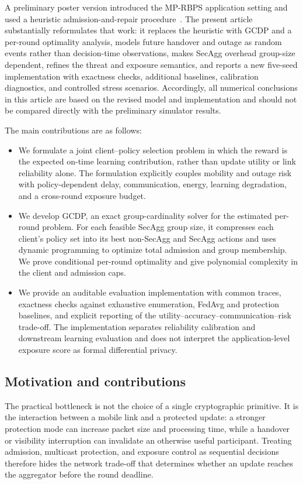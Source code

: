 \documentclass[preprint,12pt]{elsarticle}
\begin{document}
A preliminary poster version introduced the MP-RBPS application setting and used a heuristic admission-and-repair procedure~\cite{ma2026mswim}. The present article substantially reformulates that work: it replaces the heuristic with GCDP and a per-round optimality analysis, models future handover and outage as random events rather than decision-time observations, makes SecAgg overhead group-size dependent, refines the threat and exposure semantics, and reports a new five-seed implementation with exactness checks, additional baselines, calibration diagnostics, and controlled stress scenarios. Accordingly, all numerical conclusions in this article are based on the revised model and implementation and should not be compared directly with the preliminary simulator results.

The main contributions are as follows:
\begin{itemize}
	\item We formulate a joint client--policy selection problem in which the reward is the expected on-time learning contribution, rather than update utility or link reliability alone. The formulation explicitly couples mobility and outage risk with policy-dependent delay, communication, energy, learning degradation, and a cross-round exposure budget.
	
	\item We develop GCDP, an exact group-cardinality solver for the estimated per-round problem. For each feasible SecAgg group size, it compresses each client's policy set into its best non-SecAgg and SecAgg actions and uses dynamic programming to optimize total admission and group membership. We prove conditional per-round optimality and give polynomial complexity in the client and admission caps.
	
	\item We provide an auditable evaluation implementation with common traces, exactness checks against exhaustive enumeration, FedAvg and protection baselines, and explicit reporting of the utility--accuracy--communication--risk trade-off. The implementation separates reliability calibration and downstream learning evaluation and does not interpret the application-level exposure score as formal differential privacy.
\end{itemize}

\subsection{Motivation and contributions}
\label{sec:motivation_contributions}
The practical bottleneck is not the choice of a single cryptographic primitive. It is the interaction between a mobile link and a protected update: a stronger protection mode can increase packet size and processing time, while a handover or visibility interruption can invalidate an otherwise useful participant. Treating admission, multicast protection, and exposure control as sequential decisions therefore hides the network trade-off that determines whether an update reaches the aggregator before the round deadline.
\end{document}
